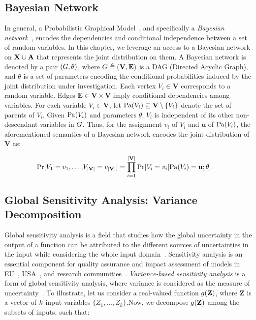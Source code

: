 \subsection*{Bayesian Network}
In general, a Probabilistic Graphical Model~\cite{koller2009probabilistic}, and specifically a \textit{Bayesian network}~\cite{pearl1985bayesian,chavira2008probabilistic}, encodes the dependencies and conditional independence between a set of random variables. In this chapter, we leverage an access to a Bayesian network on $ \mathbf{X} \cup \mathbf{A} $ that represents the joint distribution on them. 	A Bayesian network is denoted by a pair $ (G, \theta)$, where $ G \triangleq (\mathbf{V}, \mathbf{E}) $ is a DAG (Directed Acyclic Graph), and $\theta$ is a set of parameters encoding the conditional probabilities induced by the joint distribution under investigation. Each vertex $V_i \in \mathbf{V}$ corresponds to a random variable. Edges $ \mathbf{E} \in \mathbf{V} \times \mathbf{V} $ imply conditional dependencies among variables. For each variable $ V_i \in \mathbf{V} $, let $ \mathrm{Pa}(V_i) \subseteq \mathbf{V} \setminus \{V_i\} $ denote the set of parents of $ V_i $. Given $\mathrm{Pa}(V_i)$ and parameters $\theta$, $ V_i $ is independent of its other non-descendant variables in $G$. Thus, for the assignment $ v_i $ of $ V_i $ and $ \mathbf{u} $ of $ \mathrm{Pa}(V_i) $, the aforementioned semantics of a Bayesian network encodes the joint distribution of $\mathbf{V}$ as:

\begin{equation}
\begin{split}
\Pr[V_1=v_1, \dots, &V_{|\mathbf{V}|}=v_{|\mathbf{V}|}] = \prod_{i=1}^{|\mathbf{V}|} \Pr[V_i = v_i | \mathrm{Pa}(V_i) = \mathbf{u}; \theta].
\end{split}
\label{fvgm_eq:BN}
\end{equation}


\subsection*{Global Sensitivity Analysis: Variance Decomposition}
Global sensitivity analysis is a field that studies how the global uncertainty in the output of a function can be attributed to the different sources of uncertainties in the input while considering the whole input domain~\cite{saltelli2008global}.
Sensitivity analysis is an essential component for quality assurance and impact assessment of models in EU~\cite{eu}, USA~\cite{usepa}, and research communities~\cite{saltelli2020five}.
\emph{Variance-based sensitivity analysis} is a form of global sensitivity analysis, where variance is considered as the measure of uncertainty~\cite{sobol1990sensitivity,sobol2001global}. To illustrate, let us consider a real-valued function $  g(\mathbf{Z}) $, where $ \mathbf{Z} $ is a vector of $ k $ input variables $ \{Z_1, \dots, Z_k\} $.Now, we decompose $ g(\mathbf{Z}) $ among the subsets of inputs, such that:

